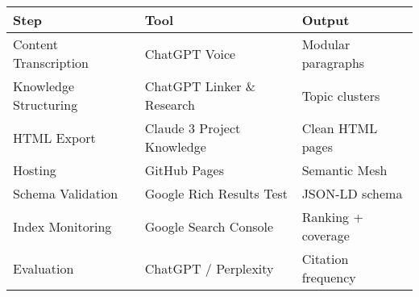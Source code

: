 \begin{center}
\begin{tabular}{|l|l|l|}
\hline
\textbf{Step} & \textbf{Tool} & \textbf{Output} \\\hline
Content Transcription & ChatGPT Voice & Modular paragraphs \\\hline
Knowledge Structuring & ChatGPT Linker \& Research & Topic clusters \\\hline
HTML Export & Claude 3 Project Knowledge & Clean HTML pages \\\hline
Hosting & GitHub Pages & Semantic Mesh \\\hline
Schema Validation & Google Rich Results Test & JSON-LD schema \\\hline
Index Monitoring & Google Search Console & Ranking + coverage \\\hline
Evaluation & ChatGPT / Perplexity & Citation frequency \\\hline
\end{tabular}
\end{center}
